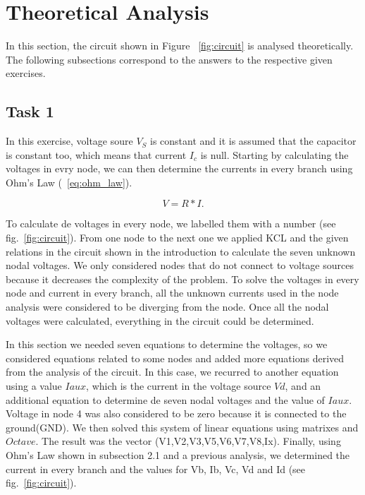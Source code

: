 \section{Theoretical Analysis}
\label{sec:analysis}

In this section, the circuit shown in Figure ~\ref{fig:circuit}
 is analysed theoretically. The following subsections correspond to the answers to the respective given exercises. 

\subsection{Task 1}

In this exercise, voltage soure $V_{S}$ is constant and it is assumed that the capacitor is constant too, which means that current $I_{c}$ is null.
Starting by calculating the voltages in evry node, we can then determine the currents in every branch using Ohm's Law (~\ref{eq:ohm_law}). 

\begin{equation}
  V= R*I.
  \label{eq:ohm_law}
\end{equation}

To calculate de voltages in every node, we labelled them with a number (see fig.~\ref{fig:circuit}). From one node to the next one we applied KCL and the given relations in the circuit shown in the introduction to calculate the seven unknown nodal voltages. We only considered nodes that do not connect to voltage sources because it decreases the complexity of the problem. 
To solve the voltages in every node and current in every branch, all the unknown currents used in the node analysis were considered to be diverging from the node. Once all the nodal voltages were calculated, everything in the circuit could be determined.

In this section we needed seven equations to determine the voltages, so we considered equations related to some nodes and added more equations derived from the analysis of the circuit. In this case, we recurred to another equation using a value $Iaux$, which is the current in the voltage source $Vd$, and an additional equation to determine de seven nodal voltages and the value of $Iaux$. Voltage in node 4 was also considered to be zero because it is connected to the ground(GND). We then solved this system of linear equations using matrixes and $Octave$. The result was the vector (V1,V2,V3,V5,V6,V7,V8,Ix). Finally, using Ohm’s Law shown in subsection 2.1 and a previous analysis, we determined the current in every branch and the values for Vb, Ib, Vc, Vd and Id (see fig.~\ref{fig:circuit}).


